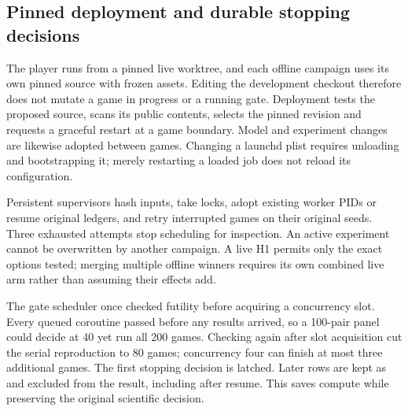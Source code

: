 \subsection{Pinned deployment and durable stopping decisions}
The player runs from a pinned live worktree, and each offline campaign uses
its own pinned source with frozen assets. Editing the development checkout
therefore does not mutate a game in progress or a running gate. Deployment
tests the proposed source, scans its public contents, selects the pinned
revision and requests a graceful restart at a game boundary. Model and
experiment changes are likewise adopted between games. Changing a launchd
plist requires unloading and bootstrapping it; merely restarting a loaded
job does not reload its configuration.

Persistent supervisors hash inputs, take locks, adopt existing worker PIDs
or resume original ledgers, and retry interrupted games on their original
seeds. Three exhausted attempts stop scheduling for inspection. An active
experiment cannot be overwritten by another campaign. A live H1 permits only
the exact options tested; merging multiple offline winners requires its own
combined live arm rather than assuming their effects add.

The gate scheduler once checked futility before acquiring a concurrency
slot. Every queued coroutine passed before any results arrived, so a
100-pair panel could decide at 40 yet run all 200 games. Checking again after
slot acquisition cut the serial reproduction to 80 games; concurrency four
can finish at most three additional games. The first stopping decision is
latched. Later rows are kept as  and excluded from the
result, including after resume. This saves compute while preserving the
original scientific decision.


